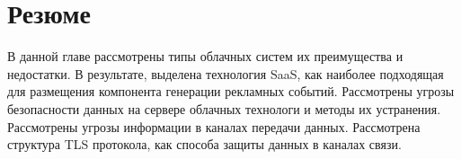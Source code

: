 \section{Резюме}

В данной главе рассмотрены типы облачных систем их преимущества и недостатки. В результате, выделена технология SaaS, как наиболее подходящая для размещения компонента генерации рекламных событий. Рассмотрены угрозы безопасности данных на сервере облачных технологи и методы их устранения. Рассмотрены угрозы информации в каналах передачи данных. Рассмотрена структура TLS протокола, как способа защиты данных в каналах связи.

